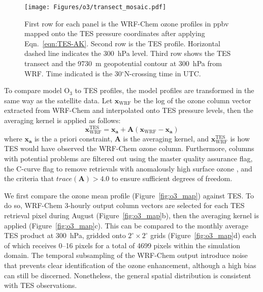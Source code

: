  \begin{figure}
 \texttt{[image: Figures/o3/transect\_mosaic.pdf]}
 \caption[Transect-by-transect comparison against TES $\mathrm{O_3}$]{First row for each panel is the WRF-Chem ozone profiles in ppbv mapped onto the TES
pressure coordinates after applying Eqn.~\ref{eqn:TES-AK}. Second row is the TES profile. Horizontal
dashed line indicates the 300~hPa level. Third row shows the TES transect and the 9730~m
geopotential contour at 300~hPa from WRF. Time indicated is the 30$^\circ$N-crossing time in UTC.}
 \label{fig:o3_transect}
 \end{figure}

To compare model O$_3$ to TES profiles, the model profiles are transformed in
the same way as the satellite data. Let $\mathbf{x}_{\mathrm{WRF}}$ be the log of the ozone column
vector extracted from WRF-Chem and interpolated onto TES pressure levels, then the
averaging kernel is applied as follows:
	\begin{equation}\label{eqn:TES-AK}
		\mathbf{x}_{\mathrm{WRF}}^{\mathrm{TES}} = \mathbf{x_a} +
		\mathbf{A}\left(\mathbf{x}_{\mathrm{WRF}}-\mathbf{x_a}\right)
	\end{equation}
where $\mathbf{x_a}$ is the a priori constraint, $\mathbf{A}$ is the averaging kernel,
and $\mathbf{x}_{\mathrm{WRF}}^{\mathrm{TES}}$ is how TES would have observed the
WRF-Chem ozone column. Furthermore, columns with potential problems are filtered
out using the master quality assurance flag, the C-curve flag to remove retrievals with
anomalously high surface ozone \citep{Zhang:2010fk}, and the criteria that
$trace(\mathbf{A})>4.0$ to ensure sufficient degrees of freedom.

We first compare the ozone mean profile (Figure~\ref{fig:o3_map}) against TES. To
do so, WRF-Chem 3-hourly output column vectors are selected for each TES retrieval
pixel during August (Figure~\ref{fig:o3_map}b), then the averaging kernel
is applied (Figure~\ref{fig:o3_map}c). This can be compared to the
monthly average TES product at 300~hPa, gridded onto $2^\circ\times2^\circ$ grids (Figure~\ref{fig:o3_map}d)
each of which receives 0--16 pixels for a total of 4699 pixels within the simulation
domain. The temporal subsampling of the WRF-Chem output introduce noise
that prevents clear identification of the ozone enhancement, although a high bias
can still be discerned. Nonetheless, the general spatial distribution is consistent with TES observations.

